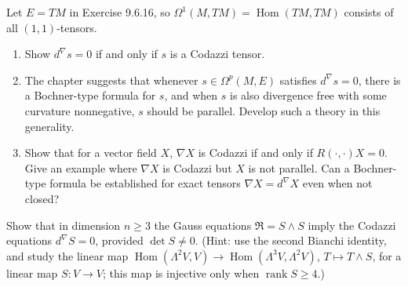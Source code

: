 \begin{remark}[Exercise 9.6.17]
  \label{rem:pet-ch9-exercise-9-6-17}
  Let $E=TM$ in Exercise 9.6.16, so $\Omega^1(M,TM)=\operatorname{Hom}(TM,TM)$ consists of
  all $(1,1)$-tensors.
  \begin{enumerate}
    \item[(1)] Show $d^\nabla s=0$ if and only if $s$ is a Codazzi tensor.
    \item[(2)] The chapter suggests that whenever $s\in\Omega^p(M,E)$ satisfies
      $d^\nabla s=0$, there is a Bochner-type formula for $s$, and when $s$ is
      also divergence free with some curvature nonnegative, $s$ should be
      parallel. Develop such a theory in this generality.
    \item[(3)] Show that for a vector field $X$, $\nabla X$ is Codazzi if and
      only if $R(\cdot,\cdot)X=0$. Give an example where $\nabla X$ is Codazzi
      but $X$ is not parallel. Can a Bochner-type formula be established for
      exact tensors $\nabla X=d^\nabla X$ even when not closed?
  \end{enumerate}
\end{remark}

\begin{remark}
  \label{rem:pet-ch9-exercise-9-6-18}
  Show that in dimension $n\ge3$ the Gauss equations $\mathfrak{R}=S\wedge S$
  imply the Codazzi equations $d^\nabla S=0$, provided $\det S\ne0$. (Hint: use
  the second Bianchi identity, and study the linear map
  $\operatorname{Hom}(\Lambda^2V,V)\to\operatorname{Hom}(\Lambda^3V,\Lambda^2V)$, $T\mapsto T\wedge S$,
  for a linear map $S:V\to V$; this map is injective only when
  $\operatorname{rank}S\ge4$.)
\end{remark}

